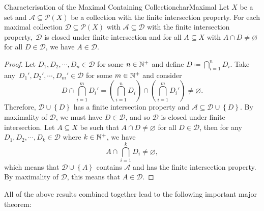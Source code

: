 \documentclass[math]{amznotes}
\theoremstyle{remark}
\begin{document}
\begin{probox}{Characterisation of the Maximal Containing Collection}{charMaximal}
    Let $X$ be a set and $\mathcal{A} \subseteq \mathcal{P}\left(X\right)$ be a collection with the finite intersection property. For each maximal collection $\mathcal{D} \subseteq \mathcal{P}\left(X\right)$ with $\mathcal{A} \subseteq \mathcal{D}$ with the finite intersection property,~$\mathcal{D}$ is closed under finite intersection and for all $A \subseteq X$ with $A \cap D \neq \varnothing$ for all $D \in \mathcal{D}$, we have $A \in \mathcal{D}$.
    \tcblower
    \begin{proof}
        Let $D_1, D_2, \cdots, D_n \in \mathcal{D}$ for some $n \in \mathbb{N}^+$ and define $D \coloneqq \bigcap_{i = 1}^nD_i$. Take any~$D_1', D_2', \cdots, D_m' \in \mathcal{D}$ for some $m \in \mathbb{N}^+$ and consider 
        \begin{equation*}
            D \cap \bigcap_{i = 1}^mD_i' = \left(\bigcap_{i = 1}^nD_i\right) \cap \left(\bigcap_{i = 1}^mD_i'\right) \neq \varnothing.
        \end{equation*}
        Therefore, $\mathcal{D} \cup \left\{D\right\}$ has a finite intersection property and $\mathcal{A} \subseteq \mathcal{D} \cup \left\{D\right\}$. By maximality of $\mathcal{D}$, we must have $D \in \mathcal{D}$, and so $\mathcal{D}$ is closed under finite intersection. Let $A \subseteq X$ be such that $A \cap D \neq \varnothing$ for all $D \in \mathcal{D}$, then for any $D_1, D_2, \cdots, D_k \in \mathcal{D}$ where $k \in \mathbb{N}^+$, we have 
        \begin{equation*}
            A \cap \bigcap_{i = 1}^kD_i \neq \varnothing,
        \end{equation*}
        which means that $\mathcal{D} \cup \left\{A\right\}$ contains $\mathcal{A}$ and has the finite intersection property. By maximality of $\mathcal{D}$, this means that $A \in \mathcal{D}$.
    \end{proof}
\end{probox}
All of the above results combined together lead to the following important major theorem:
\end{document}
